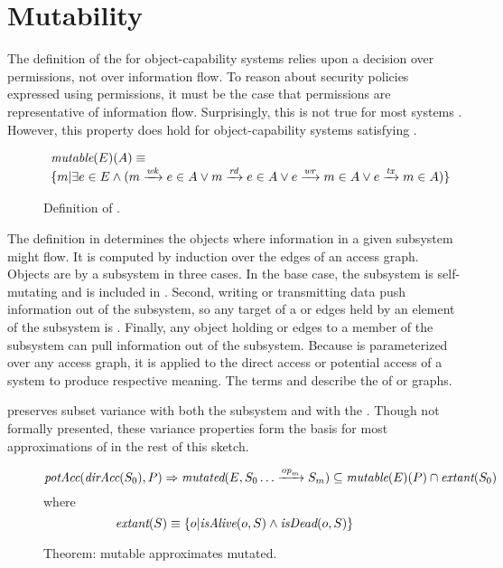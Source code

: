 \section{Mutability}

The definition of the \term{\TMconfinementTest} for object-capability systems relies upon a decision over permissions, not over information flow.
To reason about security policies expressed using permissions, it must be the case that permissions are representative of information flow.
Surprisingly, this is not true for most systems \cite{HRU1976}.
However, this property does hold for object-capability systems satisfying \TMmodelName{}.

\begin{figure}
  \[
  \begin{array}{l}
    \textit{mutable}(E)(A) \equiv \\
    \{ m | \exists e \in E \wedge (
    m \xrightarrow{\textit{wk}} e \in A \vee
    m \xrightarrow{\textit{rd}} e \in A \vee
    e \xrightarrow{\textit{wr}} m \in A \vee
    e \xrightarrow{\textit{tx}} m \in A )
    \}
    \end{array}
  \]
  \caption{Definition of \TMmutable{}. \label{fig:sketch:mutable}}
\end{figure}


The definition \NMmutable{} in  determines the objects where information in a given subsystem might flow.
It is computed by induction over the edges of an access graph.
Objects are \NMmutable{} by a subsystem in three cases.
In the base case, the subsystem is self-mutating and is included in \NMmutable{}.
Second, writing or transmitting data push information out of the subsystem, so any target of a \NMwr{} or \NMtx{} edges held by an element of the subsystem is \NMmutable{}.
Finally, any object holding \NMrd{} or \NMwk{} edges to a member of the subsystem can pull information out of the subsystem.
Because \NMmutable{} is parameterized over any access graph, it is applied to the direct access or potential access of a system to produce respective meaning.
The terms \term{\TMdirMutability} and \term{\TMpotMutability} describe the \TMmutability{} of \TMdirAcc{} or \TMpotAcc{} graphs.

\Term{\TMmutable} preserves subset variance with both the subsystem and with the \TMaccessGraph{}.
Though not formally presented, these variance properties form the basis for most approximations of \TMmutability{} in the rest of this sketch.

\begin{figure}
  \[
  \textit{potAcc}(\textit{dirAcc}(S_0),P) \Rightarrow \textit{mutated}(E,S_0 \dots \xrightarrow {\textit{op}_m} S_m ) \subseteq \textit{mutable}(E)(P) \cap \textit{extant}(S_0)
  \]
  where
  \[
  \textit{extant}(S) \equiv \{o | \textit{isAlive}(o,S) \wedge \textit{isDead}(o,S) \}
  \]
  \caption{Theorem: mutable approximates mutated. \label{thm:sketch:mutableSubset}}
\end{figure}

